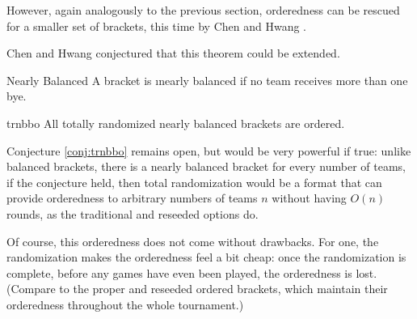 {{        %

    }{}

    However, again analogously to the previous section, orderedness can be rescued for a smaller set of brackets, this time by Chen and Hwang \cite{totally_random_balanced}.


    Chen and Hwang conjectured that this theorem could be extended.

    \begin{definition}{Nearly Balanced}{}
        A bracket is \i{nearly balanced} if no team receives more than one bye.
    \end{definition}

    \begin{conj}{}{trnbbo}
        All totally randomized nearly balanced brackets are ordered.
    \end{conj}

    Conjecture \ref{conj:trnbbo} remains open, but would be very powerful if true: unlike balanced brackets, there is a nearly balanced bracket for every number of teams, if the conjecture held, then total randomization would be a format that can provide orderedness to arbitrary numbers of teams $n$ without having $O(n)$ rounds, as the traditional and reseeded options do.

    Of course, this orderedness does not come without drawbacks. For one, the randomization makes the orderedness feel a bit cheap: once the randomization is complete, before any games have even been played, the orderedness is lost. (Compare to the proper and reseeded ordered brackets, which maintain their orderedness throughout the whole tournament.)

}
